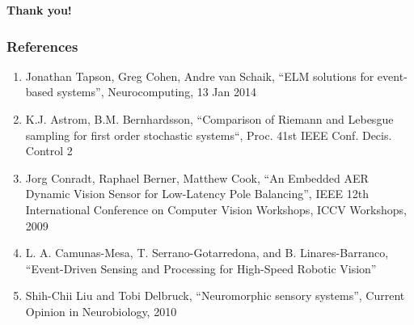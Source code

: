 \documentclass[11pt,center]{beamer}
\begin{document}
	\begin{frame}[plain,c]
		\begin{center}
			\Large{\textbf{Thank you!}}
		\end{center}
	\end{frame}
	\begin{frame}[allowframebreaks]
		\frametitle{References}
		\begin{enumerate}
			\item Jonathan Tapson, Greg Cohen, Andre van Schaik, ``ELM solutions for event-based systems'',
				Neurocomputing, 13 Jan 2014
			\item K.J. Astrom, B.M. Bernhardsson, ``Comparison of Riemann and Lebesgue sampling for
				first order stochastic systems``, Proc. 41st IEEE Conf. Decis. Control 2
			\item Jorg Conradt, Raphael Berner, Matthew Cook, ``An Embedded AER Dynamic Vision Sensor for
				Low-Latency Pole Balancing'', IEEE 12th International Conference on Computer Vision
				Workshops, ICCV Workshops, 2009
			\item L. A. Camunas-Mesa, T. Serrano-Gotarredona, and B. Linares-Barranco, ``Event-Driven Sensing and Processing for
				High-Speed Robotic Vision''
			\item Shih-Chii Liu and Tobi Delbruck, ``Neuromorphic sensory systems'', Current Opinion in Neurobiology, 2010
		\end{enumerate}

	\end{frame}

\end{document}

